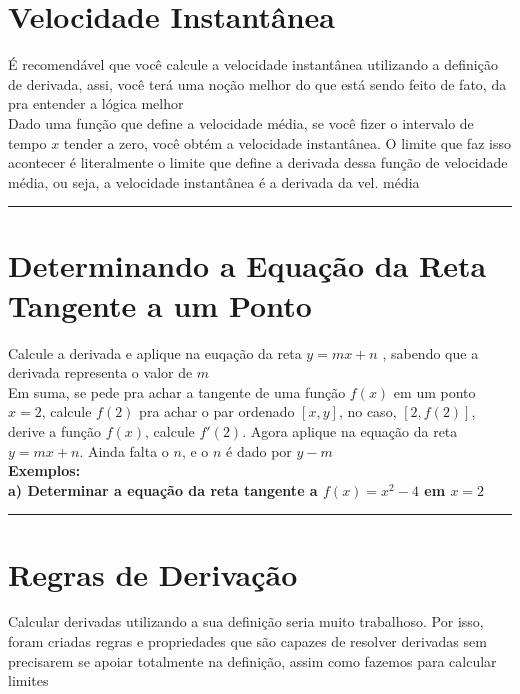 \documentclass{article}
\begin{document}
\section{Velocidade Instantânea}
É recomendável que você calcule a velocidade instantânea utilizando a definição de derivada, assi, você terá uma noção melhor do que está sendo feito de fato, da pra entender a lógica melhor
\\[10pt]
Dado uma função que define a velocidade média, se você fizer o intervalo de tempo $x$ tender a zero, você obtém a velocidade instantânea. O limite que faz isso acontecer é literalmente o limite que define a derivada dessa função de velocidade média, ou seja, a velocidade instantânea é a derivada da vel. média
\vspace{15pt}
\hrule
\section{Determinando a Equação da Reta Tangente a um Ponto}
Calcule a derivada e aplique na euqação da reta $y = mx + n$ , sabendo que a derivada representa o valor de $m$
\\[10pt]
Em suma, se pede pra achar a tangente de uma função $f(x)$ em um ponto $x = 2$, calcule $f(2)$ pra achar o par ordenado $[x, y]$, no caso, $[2, f(2)]$, derive a função $f(x)$, calcule $f'(2)$. Agora aplique na equação da reta $y = mx + n$. Ainda falta o $n$, e o $n$ é dado por $y - m$
\\[10pt]
\textbf{Exemplos:}
\\[10pt]
\textbf{a) Determinar a equação da reta tangente a $f(x) = x^{2} - 4$ em $x = 2$}
\vspace{15pt}
\hrule
\section{Regras de Derivação}
Calcular derivadas utilizando a sua definição seria muito trabalhoso. Por isso, foram criadas regras e propriedades que são capazes de resolver derivadas sem precisarem se apoiar totalmente na definição, assim como fazemos para calcular limites
\end{document}
